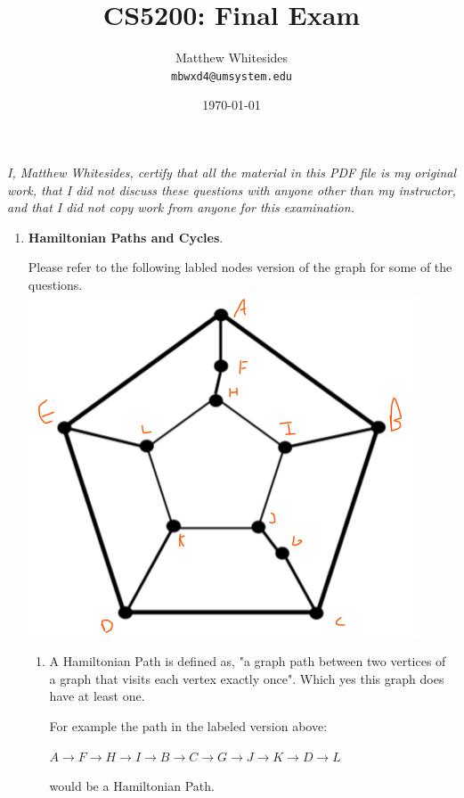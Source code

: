 \documentclass{article}
\title{CS5200: Final Exam} %
\author{Matthew Whitesides\\ \texttt{mbwxd4@umsystem.edu}} %
\date{\today} %
\begin{document}
  \maketitle %

  \textit{I, Matthew Whitesides, certify that all the material in this PDF file is my original work, that I did not discuss these questions with anyone other than my instructor, and that I did not copy work from anyone for this examination.}
 
  \begin{enumerate}
    \item \textbf{Hamiltonian Paths and Cycles}.
    
    Please refer to the following labled nodes version of the graph for some of the questions.\\
    \includegraphics[scale=0.75]{1_Graph.png}

    \begin{enumerate}
        \item A Hamiltonian Path is defined as, "a graph path between two vertices of a graph that visits each vertex exactly once". Which yes this graph does have at least one. 
        
        For example the path in the labeled version above: 
        
        ${A \rightarrow F \rightarrow H \rightarrow I \rightarrow B \rightarrow C \rightarrow G \rightarrow J \rightarrow K \rightarrow D \rightarrow L}$ 
        
        would be a Hamiltonian Path.


\end{enumerate}
\end{enumerate}
\end{document}
